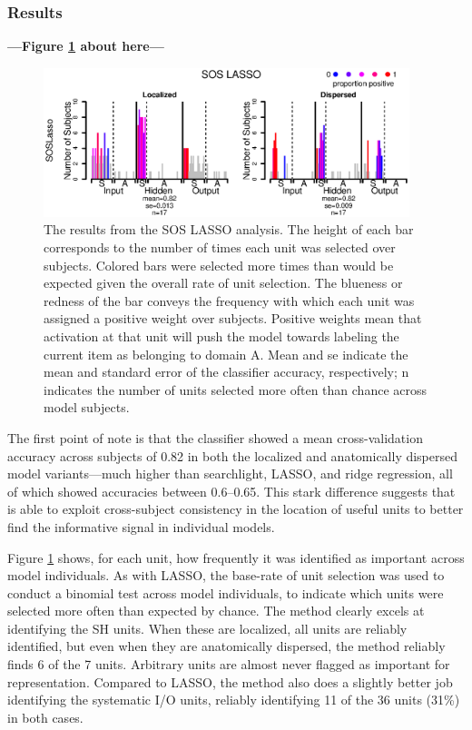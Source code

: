 \subsubsection{Results}

\begin{center}
\textbf{---Figure \ref{fig.sos} about here---}
\end{center}


\begin{figure}
\centering
\includegraphics[width=0.95\textwidth]{figures/figure9.eps}
\caption{The results from the SOS LASSO analysis. The height of each bar corresponds to the number of times each unit was selected over subjects. Colored bars were selected more times than would be expected given the overall rate of unit selection. The blueness or redness of the bar conveys the frequency with which each unit was assigned a positive weight over subjects. Positive weights mean that activation at that unit will push the model towards labeling the current item as belonging to domain A. Mean and se indicate the mean and standard error of the classifier accuracy, respectively; n indicates the number of units selected more often than chance across model subjects.}
\label{fig.sos} 
\end{figure}

The first point of note is that the \soslasso classifier showed a mean cross-validation accuracy across subjects of 0.82 in both the localized and anatomically dispersed model variants---much higher than searchlight, LASSO, and ridge regression, all of which showed accuracies between 0.6--0.65. This stark difference suggests that \soslasso is able to exploit cross-subject consistency in the location of useful units to better find the informative signal in individual models.

Figure \ref{fig.sos} shows, for each unit, how frequently it was identified as important across model individuals. As with LASSO, the base-rate of unit selection was used to conduct a binomial test across model individuals, to indicate which units were selected more often than expected by chance. The method clearly excels at identifying the SH units. When these are localized, all units are reliably identified, but even when they are anatomically dispersed, the method reliably finds 6 of the 7 units. Arbitrary units are almost never flagged as important for representation. Compared to LASSO, the method also does a slightly better job identifying the systematic I/O units, reliably identifying 11 of the 36 units (31\%) in both cases.

